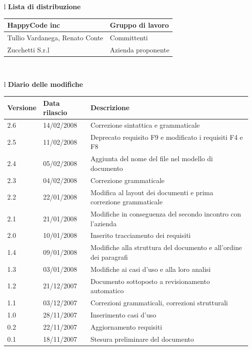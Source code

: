 \documentclass[11pt,titlepage,a4paper]{report}
\begin{document}
\begin{center}
\begin{table}[hbtp]
\large{
\begin{tabular}{l}
\Large{\textbf{\textsf{Lista di distribuzione}}} \\
\begin{tabular}{||p{6cm}||p{6cm}||} \hline
{HappyCode inc}& Gruppo di lavoro\\ \hline
{Tullio Vardanega, Renato Conte}& Committenti \\ \hline 
{Zucchetti S.r.l}& Azienda proponente\\ \hline
\end{tabular} \\
\end{tabular}
}
\end{table}
\begin{table}[hbtp]
\large{
\begin{tabular}{l}
\Large{\textbf{\textsf{Diario delle modifiche}}} \\
\begin{tabular}{||p{2cm}||p{3.5cm}||p{6cm}||} \hline
\textbf{Versione} & \textbf{Data rilascio} & \textbf{Descrizione} \\ \hline
2.6 & 14/02/2008 & Correzione sintattica e grammaticale\\ \hline
2.5 & 11/02/2008 & Deprecato requisito F9 e modificato i requisiti F4 e F8\\ \hline
2.4 & 05/02/2008 & Aggiunta del nome del file nel modello di documento\\ \hline
2.3 & 04/02/2008 & Correzione grammaticale\\ \hline
2.2 & 22/01/2008 & Modifica al layout dei documenti e prima correzione grammaticale\\ \hline
2.1 & 21/01/2008 & Modifiche in conseguenza del secondo incontro con l'azienda\\ \hline
2.0 & 10/01/2008 & Inserito tracciamento dei requisiti\\ \hline
1.4 & 09/01/2008 & Modifiche alla struttura del documento e all'ordine dei paragrafi\\ \hline
1.3 & 03/01/2008 & Modifiche ai casi d'uso e alla loro analisi\\ \hline
1.2 & 21/12/2007 & Documento sottoposto a revisionamento automatico\\ \hline
1.1 & 03/12/2007 & Correzioni grammaticali, correzioni strutturali\\ \hline
1.0 & 28/11/2007 & Inserimento casi d'uso\\ \hline
0.2 & 22/11/2007 & Aggiornamento requisiti \\ \hline
0.1 & 18/11/2007 & Stesura preliminare del documento \\ \hline

\end{tabular} 
\end{tabular}

}
\end{table}
\end{center}
\newpage
\end{document}
